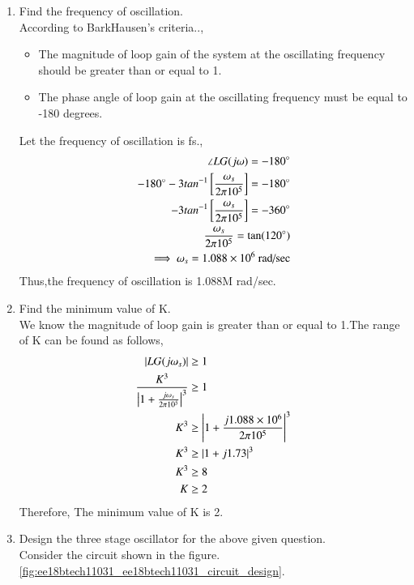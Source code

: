 \begin{enumerate}[label=\arabic*.,ref=\theenumi]
\item Find the frequency of oscillation.\\
\solution According to BarkHausen's criteria..,
\begin{itemize}
    \item The magnitude of loop gain of the system at the oscillating frequency should be greater than or equal to 1.
    \item The phase angle of loop gain at the oscillating frequency must be equal to -180 degrees.
\end{itemize}
Let the frequency of oscillation is fs.,
\begin{align}
    \angle LG(j\omega) = -180\degree\\
    -180\degree - 3tan^{-1}{}\left[\frac{\omega_s}{2\pi10^5}\right] = -180\degree \\
    - 3tan^{-1}{}\left[\frac{\omega_s}{2\pi10^5}\right] = -360\degree\\
    \frac{\omega_s}{2\pi10^5} =  \tan(120\degree)\\
    \implies \omega_s = 1.088\times10^6\text{ rad/sec}\label{eq:ee18btech11031_frequency}
\end{align}
Thus,the frequency of oscillation is 1.088M rad/sec.
\item Find the minimum value of K.\\
\solution 
We know the magnitude of loop gain is greater than or equal to 1.The range of K can be found as follows,
\begin{align}
    \left\vert LG(j\omega_s)\right\vert &\geq 1 \\
    \frac{K^3}{\left\vert1+\frac{j\omega_s}{2\pi10^5}\right\vert^3} &\geq 1 \\
    K^3 &\geq \left\vert1+\frac{j1.088\times10^6}{2\pi10^5}\right\vert^3\\
     K^3 &\geq \left\vert1+j1.73\right\vert^3\\
     K^3 &\geq 8 \\
     K &\geq 2
\end{align}
Therefore, The minimum value of K is 2.
\item Design the three stage oscillator for the above given question.
\\
\solution Consider the circuit shown in the figure.\ref{fig:ee18btech11031_ee18btech11031_circuit_design}.\\
\begin{figure}[!hbt]
	\begin{center}
			\resizebox{\columnwidth}{!}{}

\end{center}
\end{figure}
\end{enumerate}
